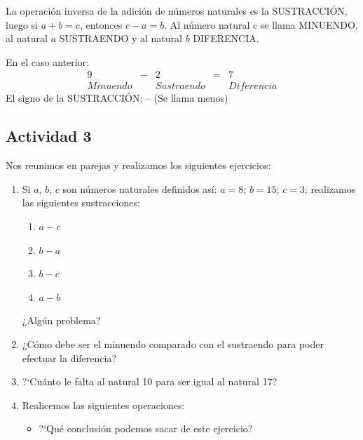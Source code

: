 \documentclass[10pt,twoside]{article}
\begin{document}
La operación inversa de la adición de números naturales es la SUSTRACCIÓN,
luego si $a + b = c$, entonces $c - a = b$. Al número natural $c$ se llama MINUENDO,
al natural $a$ SUSTRAENDO y al natural $b$ DIFERENCIA.

En el caso anterior:
\[
\begin{array}{ccccc}
9 & - & 2 & = & 7 \\
Minuendo &  & Sustraendo &  & Diferencia
\end{array}
\] 
El signo de la SUSTRACCIÓN: -- (Se llama menos)
\subsection*{Actividad 3}
Nos reunimos en parejas y realizamos los siguientes ejercicios:
\begin{enumerate}
\item Si $a$, $b$, $c$ son números naturales definidos así: $a = 8$; $b = 15$; $c = 3$; realizamos las siguientes sustracciones:
\begin{multicols}{2}
\begin{enumerate}
\item $a-c$
\item $b-a$
\item $b-c$
\item $a-b$
\end{enumerate}
\end{multicols}
¿Algún problema?
\item ¿Cómo debe ser el minuendo comparado con el sustraendo para poder efectuar la
diferencia?
\item ?`Cu\'anto le falta al natural 10 para ser igual al natural 17?
\item Realicemos las siguientes operaciones:
\begin{enumerate}
\end{enumerate}
\begin{itemize}
 \item ?`Qu\'e conclusi\'on podemos sacar de este ejercicio?

\end{itemize}
\end{enumerate}
\end{document}
